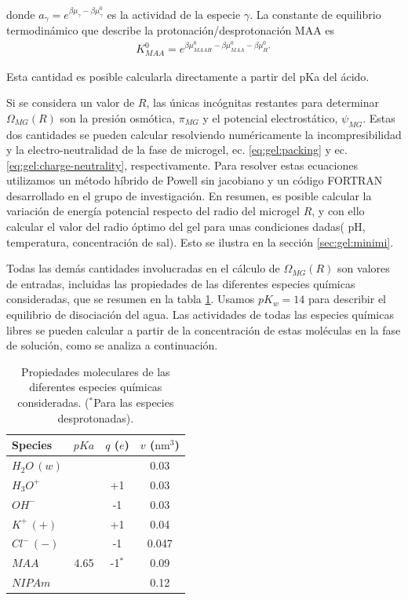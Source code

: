 \noindent donde $a_\gamma = e^{\beta\mu_\gamma-\beta\mu_\gamma^0}$ es la actividad de la especie $\gamma$. 
La constante de equilibrio termodin\'amico que describe la protonaci\'on/desprotonaci\'on MAA es
%
%
\begin{align}
K^0_{MAA}= e^{\beta\mu^0_{MAAH}-\beta\mu^0_{MAA}-\beta\mu^0_{H^+}}
\end{align}

\noindent Esta cantidad es posible calcularla directamente a partir del pKa del \'acido.


Si se considera  un valor de  $R$, las \'unicas inc\'ognitas restantes para determinar $\Omega_{MG}(R)$ son la presi\'on osm\'otica, $\pi_{MG}$ y el potencial electrost\'atico, $\psi_{MG}$.
Estas dos cantidades se pueden calcular resolviendo num\'ericamente la incompresibilidad y la electro-neutralidad de la fase de microgel, ec. \ref{eq:gel:packing} y ec. \ref{eq:gel:charge-neutrality}, respectivamente.
Para resolver estas ecuaciones utilizamos un m\'etodo h\'ibrido de Powell sin jacobiano y un c\'odigo FORTRAN desarrollado en el grupo de investigaci\'on.
En resumen, es posible calcular la variaci\'on de energ\'ia potencial respecto del radio del microgel $R$, y con ello calcular el valor del radio \'optimo del gel para unas condiciones dadas( pH, temperatura, concentraci\'on de sal). Esto se ilustra en la secci\'on \ref{sec:gel:minimi}.

Todas las dem\'as cantidades involucradas en el c\'alculo de $\Omega_{MG}(R)$ son valores de  entradas, incluidas las propiedades de las diferentes especies qu\'imicas consideradas, que se resumen en la tabla \ref{table:gel:molecules}.
Usamos $pK_w=14$ para describir el equilibrio de disociaci\'on del agua.
Las actividades de todas las especies qu\'imicas libres se pueden calcular a partir de la concentraci\'on de estas mol\'eculas en la fase de soluci\'on, como se analiza a continuaci\'on.


\begin{table}
	\centering
\begin{tabular}{|lccc|}
    \hline
    {Species} & {$pKa$} & {$q$ ($e$)} & {$v$ ($\text{nm}^3$)} \\
      \hline
$H_2O\,(w)$ & ~ & ~ & 0.03\\
$H_3O^+$ & ~ & +1 & 0.03\\
$OH^-$ & ~ & -1 & 0.03\\
$K^+\,(+)$ & ~ & +1 & 0.04\\ 
$Cl^-\,(-)$ & ~ & -1 & 0.047\\
$MAA$ & 4.65 & -1$^\ast$ & 0.09\\
$NIPAm$ & ~ & ~ & 0.12\\
    \hline
  \end{tabular}
 \caption{Propiedades moleculares de las diferentes especies qu\'imicas consideradas.
 	\footnotesize ($^\ast$Para las especies desprotonadas).}
\label{table:gel:molecules} 
\end{table}


